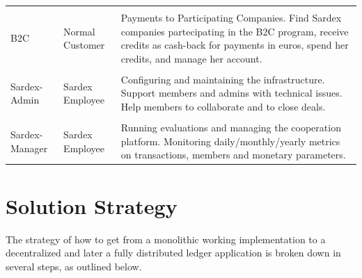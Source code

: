 \begin{longtable}[]{@{}lll@{}}
\tabularnewline
\tabularnewline
\begin{minipage}[t]{0.18\columnwidth}B2C \end{minipage} &
\begin{minipage}[t]{0.37\columnwidth}Normal Customer \end{minipage} &
\begin{minipage}[t]{0.37\columnwidth}Payments to Participating Companies. Find Sardex companies partecipating in the B2C program, receive credits as cash-back for payments in euros, spend her credits, and manage her account.\end{minipage}
\tabularnewline
\tabularnewline
\begin{minipage}[t]{0.18\columnwidth}Sardex-Admin \end{minipage} &
\begin{minipage}[t]{0.37\columnwidth}Sardex Employee \end{minipage} &
\begin{minipage}[t]{0.37\columnwidth}Configuring and maintaining the infrastructure. Support members and admins with technical issues. Help members to collaborate and to close deals.\end{minipage}
\tabularnewline
\tabularnewline
\begin{minipage}[t]{0.18\columnwidth}Sardex-Manager \end{minipage} &
\begin{minipage}[t]{0.37\columnwidth}Sardex Employee \end{minipage} &
\begin{minipage}[t]{0.37\columnwidth}Running evaluations and managing the cooperation platform. Monitoring daily/monthly/yearly metrics on transactions, members and monetary parameters. \end{minipage}
\tabularnewline


\bottomrule
\end{longtable}

\section{Solution Strategy}\label{section-solution-strategy}
The strategy of how to get from a monolithic working implementation to a decentralized and later a fully distributed ledger application is broken down in several steps, as outlined below.

